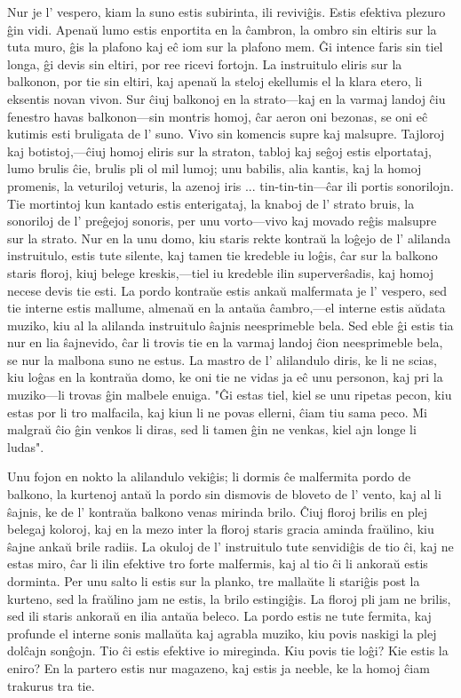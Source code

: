 Nur je l' vespero, kiam la suno estis subirinta, ili reviviĝis. Estis efektiva plezuro ĝin vidi. Apenaŭ lumo estis enportita en la ĉambron, la ombro sin eltiris sur la tuta muro, ĝis la plafono kaj eĉ iom sur la plafono mem. Ĝi intence faris sin tiel longa, ĝi devis sin eltiri, por ree ricevi fortojn. La instruitulo eliris sur la balkonon, por tie sin eltiri, kaj apenaŭ la steloj ekellumis el la klara etero, li eksentis novan vivon. Sur ĉiuj balkonoj en la strato---kaj en la varmaj landoj ĉiu fenestro havas balkonon---sin montris homoj, ĉar aeron oni bezonas, se oni eĉ kutimis esti bruligata de l' suno. Vivo sin komencis supre kaj malsupre. Tajloroj kaj botistoj,---ĉiuj homoj eliris sur la straton, tabloj kaj seĝoj estis elportataj, lumo brulis ĉie, brulis pli ol mil lumoj; unu babilis, alia kantis, kaj la homoj promenis, la veturiloj veturis, la azenoj iris ... tin-tin-tin---ĉar ili portis sonorilojn. Tie mortintoj kun kantado estis enterigataj, la knaboj de l' strato bruis, la sonoriloj de l' preĝejoj sonoris, per unu vorto---vivo kaj movado reĝis malsupre sur la strato. Nur en la unu domo, kiu staris rekte kontraŭ la loĝejo de l' alilanda instruitulo, estis tute silente, kaj tamen tie kredeble iu loĝis, ĉar sur la balkono staris floroj, kiuj belege kreskis,---tiel iu kredeble ilin superverŝadis, kaj homoj necese devis tie esti. La pordo kontraŭe estis ankaŭ malfermata je l' vespero, sed tie interne estis mallume, almenaŭ en la antaŭa ĉambro,---el interne estis aŭdata muziko, kiu al la alilanda instruitulo ŝajnis neesprimeble bela. Sed eble ĝi estis tia nur en lia ŝajnevido, ĉar li trovis tie en la varmaj landoj ĉion neesprimeble bela, se nur la malbona suno ne estus. La mastro de l' alilandulo diris, ke li ne scias, kiu loĝas en la kontraŭa domo, ke oni tie ne vidas ja eĉ unu personon, kaj pri la muziko---li trovas ĝin malbele enuiga. "Ĝi estas tiel, kiel se unu ripetas pecon, kiu estas por li tro malfacila, kaj kiun li ne povas ellerni, ĉiam tiu sama peco. \glqq{}Mi malgraŭ ĉio ĝin venkos\grqq{} li diras, sed li tamen ĝin ne venkas, kiel ajn longe li ludas".

Unu fojon en nokto la alilandulo vekiĝis; li dormis ĉe malfermita pordo de balkono, la kurtenoj antaŭ la pordo sin dismovis de bloveto de l' vento, kaj al li ŝajnis, ke de l' kontraŭa balkono venas mirinda brilo. Ĉiuj floroj brilis en plej belegaj koloroj, kaj en la mezo inter la floroj staris gracia aminda fraŭlino, kiu ŝajne ankaŭ brile radiis. La okuloj de l' instruitulo tute senvidiĝis de tio ĉi, kaj ne estas miro, ĉar li ilin efektive tro forte malfermis, kaj al tio ĉi li ankoraŭ estis dorminta. Per unu salto li estis sur la planko, tre mallaŭte li stariĝis post la kurteno, sed la fraŭlino jam ne estis, la brilo estingiĝis. La floroj pli jam ne brilis, sed ili staris ankoraŭ en ilia antaŭa beleco. La pordo estis ne tute fermita, kaj profunde el interne sonis mallaŭta kaj agrabla muziko, kiu povis naskigi la plej dolĉajn sonĝojn. Tio ĉi estis efektive io mireginda. Kiu povis tie loĝi? Kie estis la eniro? En la partero estis nur magazeno, kaj estis ja neeble, ke la homoj ĉiam trakurus tra tie.

